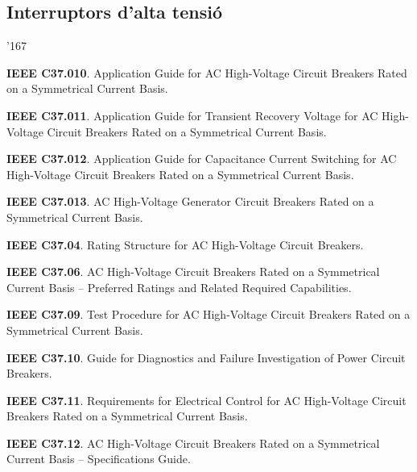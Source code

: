 \subsection*{Interruptors d'alta tensi\'{o}}
\begin{dinglist}{'167}
    \item \textbf{IEEE C37.010}. Application Guide for AC High-Voltage Circuit Breakers Rated on a Symmetrical Current Basis.
    \item \textbf{IEEE C37.011}. Application Guide for Transient Recovery Voltage for AC High-Voltage Circuit Breakers Rated on a Symmetrical Current Basis.
    \item \textbf{IEEE C37.012}. Application Guide for Capacitance Current Switching for AC High-Voltage Circuit Breakers Rated on a Symmetrical Current Basis.
    \item \textbf{IEEE C37.013}. AC High-Voltage Generator Circuit Breakers Rated on a Symmetrical Current Basis.
    \item \textbf{IEEE C37.04}. Rating Structure for AC High-Voltage Circuit Breakers.
    \item \textbf{IEEE C37.06}. AC High-Voltage Circuit Breakers Rated on a Symmetrical Current Basis -- Preferred Ratings and Related Required Capabilities.
    \item \textbf{IEEE C37.09}. Test Procedure for AC High-Voltage Circuit Breakers Rated on a Symmetrical Current Basis.
    \item \textbf{IEEE C37.10}. Guide for Diagnostics and Failure Investigation of Power Circuit Breakers.
    \item \textbf{IEEE C37.11}. Requirements for Electrical Control for AC High-Voltage Circuit Breakers Rated on a Symmetrical Current Basis.
    \item \textbf{IEEE C37.12}. AC High-Voltage Circuit Breakers Rated on a Symmetrical Current Basis -- Specifications Guide.
\end{dinglist}


